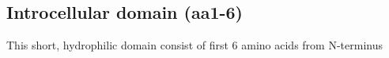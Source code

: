 \subsection{Introcellular domain (aa1-6)}

This short, hydrophilic domain consist of first 6 amino acids from  N-terminus